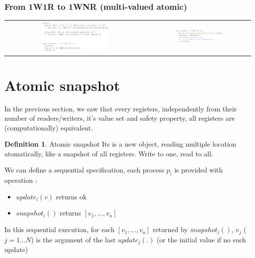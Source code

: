 \documentclass{article}
\theoremstyle{definition}
\newtheorem{definition}{Definition}[section]
\begin{document}
\subsubsection{From 1W1R to 1WNR (multi-valued atomic)}

\begin{center}
\begin{tabular}{c c}
\includegraphics[width=0.5\textwidth]{transfo5}&
\includegraphics[width=0.5\textwidth]{transfo5_2}
\end{tabular}
\end{center}


\section{Atomic snapshot}

In the previous section, we saw that every registers, independently from their number of readers/writers, it's value set and safety property, all registers are (computationally) equivalent.

\begin{definition}{Atomic snapshot}
Its is a new object, reading multiple location atomatically, like a snapshot of all registers. Write to one, read to all.
\end{definition}

We can define a sequential specification, each process $p_i$ is provided with operation :
\begin{itemize}
	\item $update_i(v)$ returns ok
	\item $snapshot_i()$ returns $[v_1, ... , v_n]$
\end{itemize}
In this sequential execution, for each $[v_1, ... , v_n]$ returned by $snapshot_i()$, $v_j$ ($j=1...N$) is the argument of the last $update_j(.)$ (or the initial value if no such update)
\end{document}
